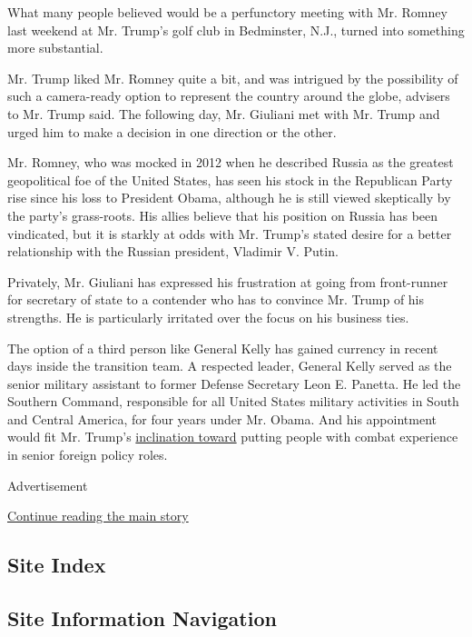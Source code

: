 What many people believed would be a perfunctory meeting with Mr. Romney
last weekend at Mr. Trump's golf club in Bedminster, N.J., turned into
something more substantial.

Mr. Trump liked Mr. Romney quite a bit, and was intrigued by the
possibility of such a camera-ready option to represent the country
around the globe, advisers to Mr. Trump said. The following day, Mr.
Giuliani met with Mr. Trump and urged him to make a decision in one
direction or the other.

Mr. Romney, who was mocked in 2012 when he described Russia as the
greatest geopolitical foe of the United States, has seen his stock in
the Republican Party rise since his loss to President Obama, although he
is still viewed skeptically by the party's grass-roots. His allies
believe that his position on Russia has been vindicated, but it is
starkly at odds with Mr. Trump's stated desire for a better relationship
with the Russian president, Vladimir V. Putin.

Privately, Mr. Giuliani has expressed his frustration at going from
front-runner for secretary of state to a contender who has to convince
Mr. Trump of his strengths. He is particularly irritated over the focus
on his business ties.

The option of a third person like General Kelly has gained currency in
recent days inside the transition team. A respected leader, General
Kelly served as the senior military assistant to former Defense
Secretary Leon E. Panetta. He led the Southern Command, responsible for
all United States military activities in South and Central America, for
four years under Mr. Obama. And his appointment would fit Mr. Trump's
\href{http://www.nytimes3xbfgragh.onion/2016/11/21/us/politics/donald-trump-national-security-military.html}{inclination
toward} putting people with combat experience in senior foreign policy
roles.

Advertisement

\protect\hyperlink{after-bottom}{Continue reading the main story}

\hypertarget{site-index}{%
\subsection{Site Index}\label{site-index}}

\hypertarget{site-information-navigation}{%
\subsection{Site Information
Navigation}\label{site-information-navigation}}

